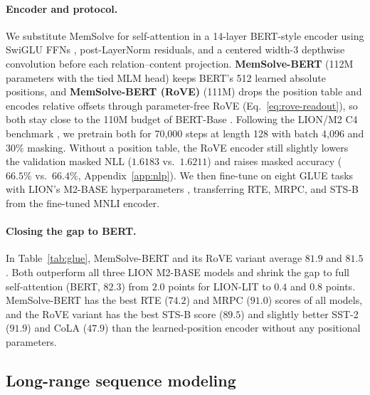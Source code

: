 \documentclass[10pt,twocolumn]{article}
\begin{document}
\paragraph{Encoder and protocol.}
We substitute MemSolve for self-attention in a 14-layer BERT-style encoder
using SwiGLU FFNs \cite{shazeer2020glu}, post-LayerNorm residuals, and a
centered width-3 depthwise convolution before each relation--content
projection.
\textbf{MemSolve-BERT} (112M parameters with the tied MLM head) keeps BERT's
512 learned absolute positions, and \textbf{MemSolve-BERT (RoVE)} (111M) drops
the position table and encodes relative offsets through parameter-free RoVE
(Eq.~\eqref{eq:rove-readout}), so both stay close to the 110M budget of
BERT-Base \cite{devlin2019bert}.
Following the LION/M2 C4 benchmark
\cite{raffel2020t5,fu2023monarch,afzal2025lion}, we pretrain both for 70,000
steps at length 128 with batch 4,096 and $30\%$ masking. Without a position
table, the RoVE encoder still slightly lowers the validation masked NLL
($1.6183$ vs.\ $1.6211$) and raises masked accuracy ($66.5\%$ vs.\ $66.4\%$,
Appendix~\ref{app:nlp}).
We then fine-tune on eight GLUE tasks with LION's M2-BASE hyperparameters
\cite{wang2019glue,fu2023monarch,afzal2025lion}, transferring RTE, MRPC, and
STS-B from the fine-tuned MNLI encoder.

\paragraph{Closing the gap to BERT.}
In Table~\ref{tab:glue}, MemSolve-BERT and its RoVE variant average $81.9$ and
$81.5$.
Both outperform all three LION M2-BASE models and shrink the gap to full
self-attention (BERT, $82.3$) from $2.0$ points for LION-LIT to $0.4$ and
$0.8$ points.
MemSolve-BERT has the best RTE ($74.2$) and MRPC ($91.0$) scores of all
models, and the RoVE variant has the best STS-B score ($89.5$) and slightly
better SST-2 ($91.9$) and CoLA ($47.9$) than the learned-position encoder
without any positional parameters.

\subsection{Long-range sequence modeling}
\label{sec:lra}
\end{document}
